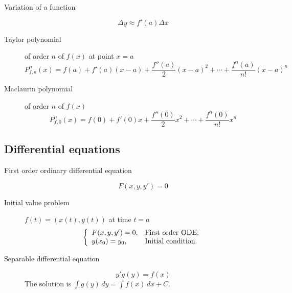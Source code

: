 \begin{multicols}{2}
	\begin{tcolorbox}[hbox, title=Function approximation]
		\begin{minipage}{0.4\textwidth}
			\flushleft
			\begin{description}
				\item[Variation of a function]
				\[
				  \Delta y\approx f'(a)\Delta x
				\]
				\item[Taylor polynomial] of order $n$ of $f(x)$ at point $x=a$
				\[
					P^n_{f,a}(x)=f(a)+f'(a)(x-a)+\frac{f''(a)}{2}(x-a)^2+\cdots+\frac{f^n(a)}{n!}(x-a)^n
				\]
				\item[Maclaurin polynomial] of order $n$ of $f(x)$
				\[
					P^n_{f,0}(x)=f(0)+f'(0)x+\frac{f''(0)}{2}x^2+\cdots+\frac{f^n(0)}{n!}x^n
				\]
			\end{description}
		\end{minipage}
	\end{tcolorbox}



\subsection*{Differential equations}

	\begin{tcolorbox}[hbox, title=First order differential equation]
		\begin{minipage}{0.4\textwidth}
			\flushleft
			\begin{description}
				\item[First order ordinary differential equation] 				      
				\[
					F(x,y,y')=0
				\]
				\item[Initial value problem] \mbox{$f(t)=(x(t),y(t))$} at time $t=a$
				\[
					\left\{
					\begin{array}{ll}
						F(x,y,y')=0, & \hbox{First order ODE;} \\
						y(x_0)=y_0, & \hbox{Initial condition.} \\
					\end{array}
					\right.    
				\]
				\item[Separable differential equation] 
			  \[
			    y'g(y)=f(x)
				\]
				The solution is $\int g(y)\,dy = \int f(x)\,dx+C.$
			\end{description}
		\end{minipage}
	\end{tcolorbox}


\end{multicols}
